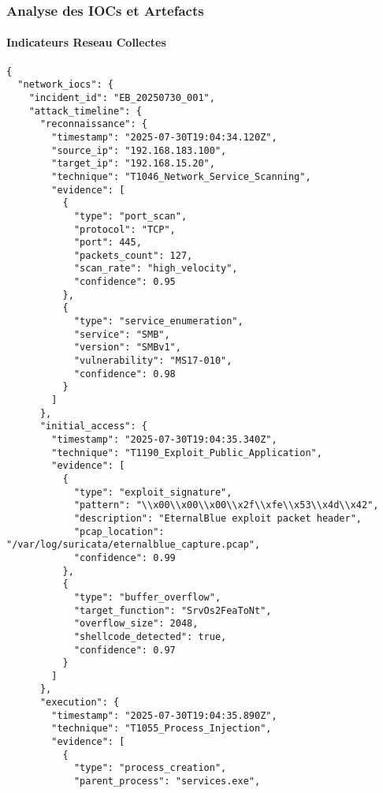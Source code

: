 \subsubsection{Analyse des IOCs et Artefacts}

\paragraph{Indicateurs Reseau Collectes}

\begin{lstlisting}[style=jsonstyle,caption=IOCs reseau extraits de l'incident EternalBlue]
{
  "network_iocs": {
    "incident_id": "EB_20250730_001",
    "attack_timeline": {
      "reconnaissance": {
        "timestamp": "2025-07-30T19:04:34.120Z",
        "source_ip": "192.168.183.100",
        "target_ip": "192.168.15.20",
        "technique": "T1046_Network_Service_Scanning",
        "evidence": [
          {
            "type": "port_scan",
            "protocol": "TCP",
            "port": 445,
            "packets_count": 127,
            "scan_rate": "high_velocity",
            "confidence": 0.95
          },
          {
            "type": "service_enumeration", 
            "service": "SMB",
            "version": "SMBv1",
            "vulnerability": "MS17-010",
            "confidence": 0.98
          }
        ]
      },
      "initial_access": {
        "timestamp": "2025-07-30T19:04:35.340Z",
        "technique": "T1190_Exploit_Public_Application",
        "evidence": [
          {
            "type": "exploit_signature",
            "pattern": "\\x00\\x00\\x00\\x2f\\xfe\\x53\\x4d\\x42",
            "description": "EternalBlue exploit packet header",
            "pcap_location": "/var/log/suricata/eternalblue_capture.pcap",
            "confidence": 0.99
          },
          {
            "type": "buffer_overflow",
            "target_function": "SrvOs2FeaToNt",
            "overflow_size": 2048,
            "shellcode_detected": true,
            "confidence": 0.97
          }
        ]
      },
      "execution": {
        "timestamp": "2025-07-30T19:04:35.890Z",
        "technique": "T1055_Process_Injection",
        "evidence": [
          {
            "type": "process_creation",
            "parent_process": "services.exe",

\end{lstlisting}
